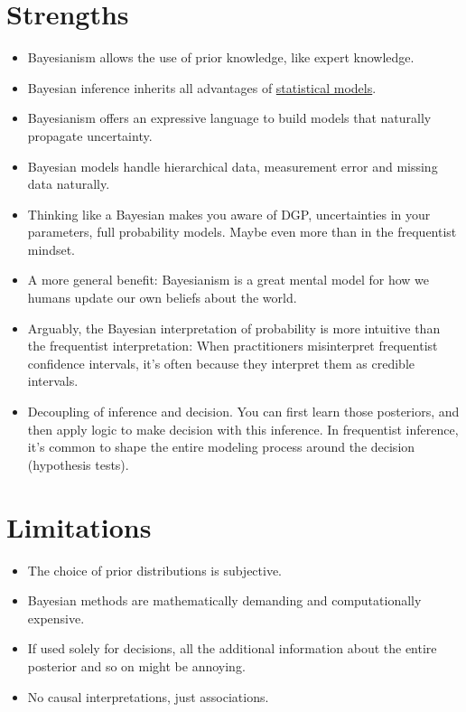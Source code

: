 \documentclass[
  10pt,
]{scrbook}
\providecommand{\tightlist}{%
  \setlength{\itemsep}{0pt}\setlength{\parskip}{0pt}}
\begin{document}
\hypertarget{strengths-2}{%
\section{Strengths}\label{strengths-2}}

\begin{itemize}
\tightlist
\item
  Bayesianism allows the use of prior knowledge, like expert knowledge.
\item
  Bayesian inference inherits all advantages of \protect\hyperlink{statistical-modeling}{statistical models}.
\item
  Bayesianism offers an expressive language to build models that naturally propagate uncertainty.
\item
  Bayesian models handle hierarchical data, measurement error and missing data naturally.
\item
  Thinking like a Bayesian makes you aware of DGP, uncertainties in your parameters, full probability models. Maybe even more than in the frequentist mindset.
\item
  A more general benefit: Bayesianism is a great mental model for how we humans update our own beliefs about the world.
\item
  Arguably, the Bayesian interpretation of probability is more intuitive than the frequentist interpretation: When practitioners misinterpret frequentist confidence intervals, it's often because they interpret them as credible intervals.
\item
  Decoupling of inference and decision. You can first learn those posteriors, and then apply logic to make decision with this inference. In frequentist inference, it's common to shape the entire modeling process around the decision (hypothesis tests).
\end{itemize}

\hypertarget{limitations-2}{%
\section{Limitations}\label{limitations-2}}

\begin{itemize}
\tightlist
\item
  The choice of prior distributions is subjective.
\item
  Bayesian methods are mathematically demanding and computationally expensive.
\item
  If used solely for decisions, all the additional information about the entire posterior and so on might be annoying.
\item
  No causal interpretations, just associations.
\end{itemize}
\end{document}
